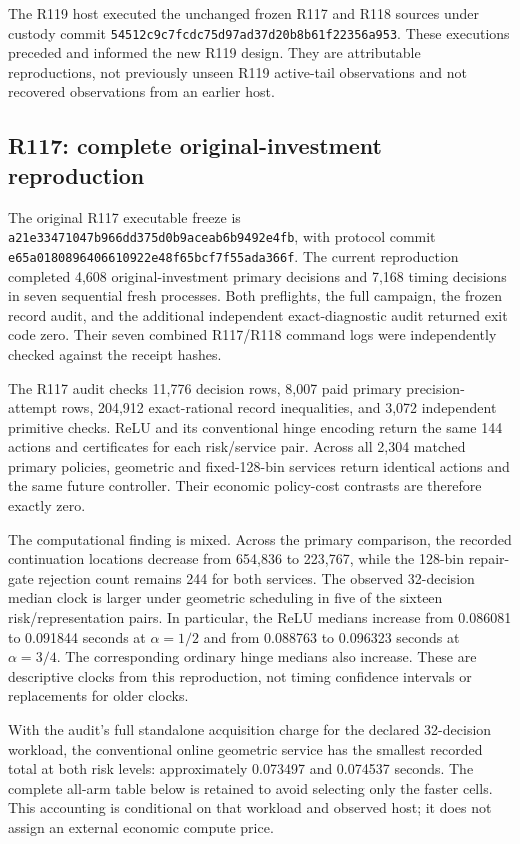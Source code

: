 The R119 host executed the unchanged frozen R117 and R118 sources under custody commit \nolinkurl{54512c9c7fcdc75d97ad37d20b8b61f22356a953}. These executions preceded and informed the new R119 design. They are attributable reproductions, not previously unseen R119 active-tail observations and not recovered observations from an earlier host.

\hypertarget{r117-complete-original-investment-reproduction}{%
\subsection{R117: complete original-investment reproduction}\label{r117-complete-original-investment-reproduction}}

The original R117 executable freeze is \nolinkurl{a21e33471047b966dd375d0b9aceab6b9492e4fb}, with protocol commit \nolinkurl{e65a0180896406610922e48f65bcf7f55ada366f}. The current reproduction completed 4,608 original-investment primary decisions and 7,168 timing decisions in seven sequential fresh processes. Both preflights, the full campaign, the frozen record audit, and the additional independent exact-diagnostic audit returned exit code zero. Their seven combined R117/R118 command logs were independently checked against the receipt hashes.

The R117 audit checks 11,776 decision rows, 8,007 paid primary precision-attempt rows, 204,912 exact-rational record inequalities, and 3,072 independent primitive checks. ReLU and its conventional hinge encoding return the same 144 actions and certificates for each risk/service pair. Across all 2,304 matched primary policies, geometric and fixed-128-bin services return identical actions and the same future controller. Their economic policy-cost contrasts are therefore exactly zero.

The computational finding is mixed. Across the primary comparison, the recorded continuation locations decrease from 654,836 to 223,767, while the 128-bin repair-gate rejection count remains 244 for both services. The observed 32-decision median clock is larger under geometric scheduling in five of the sixteen risk/representation pairs. In particular, the ReLU medians increase from 0.086081 to 0.091844 seconds at \(\alpha=1/2\) and from 0.088763 to 0.096323 seconds at \(\alpha=3/4\). The corresponding ordinary hinge medians also increase. These are descriptive clocks from this reproduction, not timing confidence intervals or replacements for older clocks.

With the audit's full standalone acquisition charge for the declared 32-decision workload, the conventional online geometric service has the smallest recorded total at both risk levels: approximately 0.073497 and 0.074537 seconds. The complete all-arm table below is retained to avoid selecting only the faster cells. This accounting is conditional on that workload and observed host; it does not assign an external economic compute price.

